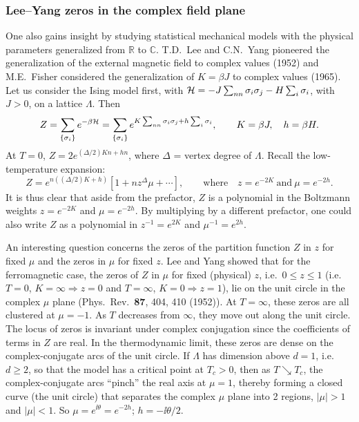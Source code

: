 \subsubsection*{Lee--Yang zeros in the complex field plane}

One also gains insight by studying statistical mechanical models with the physical parameters generalized from
$\mathbb R$ to $\mathbb C$. T.D.~Lee and C.N.~Yang pioneered the generalization of the external magnetic field to
complex values (1952) and M.E.~Fisher considered the generalization of $K = \beta J$ to complex values (1965). Let
us consider the Ising model first, with $\mathcal{H} = -J\sum_{nn}\sigma_i\sigma_j - H\sum_i\sigma_i$, with $J>0$, on a
lattice $\Lambda$. Then
\begin{equation}
  Z = \sum_{\{\sigma_i\}}e^{-\beta\mathcal{H}} = \sum_{\{\sigma_i\}}e^{K\sum_{nn}\sigma_i\sigma_j + h\sum_i\sigma_i},
  \qquad K = \beta J,\quad h = \beta H .
\end{equation}
At $T = 0$, $Z = 2e^{(\Delta/2)Kn+hn}$, where $\Delta$ = vertex degree of $\Lambda$. Recall the low-temperature
expansion:
\begin{equation}
  Z = e^{n\left((\Delta/2)K+h\right)}\left[1 + nz^\Delta\mu + \cdots\right],\qquad\text{where}\quad z = e^{-2K}\ \text{and}\ \mu = e^{-2h}.
\end{equation}
It is thus clear that aside from the prefactor, $Z$ is a polynomial in the Boltzmann weights $z = e^{-2K}$ and
$\mu = e^{-2h}$. By multiplying by a different prefactor, one could also write $Z$ as a polynomial in
$z^{-1} = e^{2K}$ and $\mu^{-1} = e^{2h}$.

An interesting question concerns the zeros of the partition function $Z$ in $z$ for fixed $\mu$ and the zeros in
$\mu$ for fixed $z$. Lee and Yang showed that for the ferromagnetic case, the zeros of $Z$ in $\mu$ for fixed
(physical) $z$, i.e.\ $0\le z\le 1$ (i.e.\ $T = 0$, $K = \infty\Rightarrow z = 0$ and $T = \infty$,
$K = 0\Rightarrow z = 1$), lie on the unit circle in the complex $\mu$ plane (Phys.\ Rev.\ \textbf{87}, 404, 410
(1952)). At $T = \infty$, these zeros are all clustered at $\mu = -1$. As $T$ decreases from $\infty$, they move
out along the unit circle. The locus of zeros is invariant under complex conjugation since the coefficients of
terms in $Z$ are real. In the thermodynamic limit, these zeros are dense on the complex-conjugate arcs of the
unit circle. If $\Lambda$ has dimension above $d = 1$, i.e.\ $d\ge 2$, so that the model has a critical point at
$T_c>0$, then as $T\searrow T_c$, the complex-conjugate arcs ``pinch'' the real axis at $\mu = 1$, thereby forming
a closed curve (the unit circle) that separates the complex $\mu$ plane into 2 regions, $|\mu|>1$ and $|\mu|<1$.
So $\mu = e^{\ii\theta} = e^{-2h}$; $h = -\ii\theta/2$.

